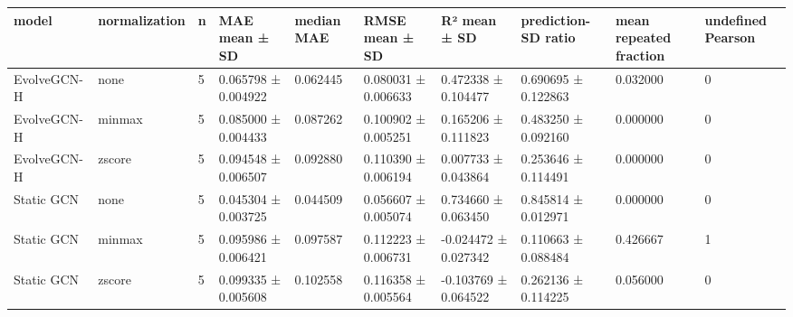 \begin{tabular}{llllllllll}
\hline
model & normalization & n & MAE mean ± SD & median MAE & RMSE mean ± SD & R² mean ± SD & prediction-SD ratio & mean repeated fraction & undefined Pearson \\
\hline
EvolveGCN-H & none & 5 & 0.065798 ± 0.004922 & 0.062445 & 0.080031 ± 0.006633 & 0.472338 ± 0.104477 & 0.690695 ± 0.122863 & 0.032000 & 0 \\
EvolveGCN-H & minmax & 5 & 0.085000 ± 0.004433 & 0.087262 & 0.100902 ± 0.005251 & 0.165206 ± 0.111823 & 0.483250 ± 0.092160 & 0.000000 & 0 \\
EvolveGCN-H & zscore & 5 & 0.094548 ± 0.006507 & 0.092880 & 0.110390 ± 0.006194 & 0.007733 ± 0.043864 & 0.253646 ± 0.114491 & 0.000000 & 0 \\
Static GCN & none & 5 & 0.045304 ± 0.003725 & 0.044509 & 0.056607 ± 0.005074 & 0.734660 ± 0.063450 & 0.845814 ± 0.012971 & 0.000000 & 0 \\
Static GCN & minmax & 5 & 0.095986 ± 0.006421 & 0.097587 & 0.112223 ± 0.006731 & -0.024472 ± 0.027342 & 0.110663 ± 0.088484 & 0.426667 & 1 \\
Static GCN & zscore & 5 & 0.099335 ± 0.005608 & 0.102558 & 0.116358 ± 0.005564 & -0.103769 ± 0.064522 & 0.262136 ± 0.114225 & 0.056000 & 0 \\
\hline
\end{tabular}

